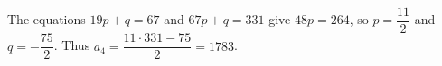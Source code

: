 The equations $19p+q=67$ and $67p+q=331$ give $48p=264$, so $p=\dfrac{11}{2}$ and $q=-\dfrac{75}{2}$. Thus $a_4=\dfrac{11\cdot331-75}{2}=\boxed{1783}$.
